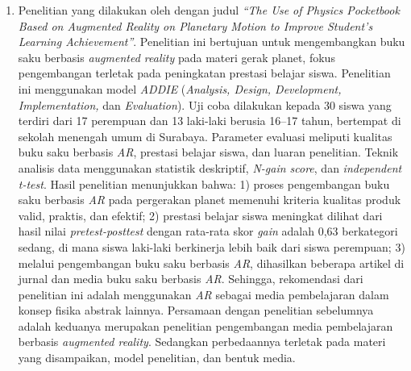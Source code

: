 \documentclass[12pt]{article}
\begin{document}
\begin{enumerate}
    \item Penelitian yang dilakukan oleh \citet{suprapto2021} dengan judul \textit{“The Use of Physics Pocketbook Based on Augmented Reality on Planetary Motion to Improve Student’s Learning Achievement”}. Penelitian ini bertujuan untuk mengembangkan buku saku berbasis \textit{augmented reality} pada materi gerak planet, fokus pengembangan terletak pada peningkatan prestasi belajar siswa. Penelitian ini menggunakan model \textit{ADDIE} (\textit{Analysis, Design, Development, Implementation,} dan \textit{Evaluation}). Uji coba dilakukan kepada 30 siswa yang terdiri dari 17 perempuan dan 13 laki-laki berusia 16–17 tahun, bertempat di sekolah menengah umum di Surabaya. Parameter evaluasi meliputi kualitas buku saku berbasis \textit{AR}, prestasi belajar siswa, dan luaran penelitian. Teknik analisis data menggunakan statistik deskriptif, \textit{N-gain score}, dan \textit{independent t-test}. Hasil penelitian menunjukkan bahwa: 1) proses pengembangan buku saku berbasis \textit{AR} pada pergerakan planet memenuhi kriteria kualitas produk valid, praktis, dan efektif; 2) prestasi belajar siswa meningkat dilihat dari hasil nilai \textit{pretest-posttest} dengan rata-rata skor \textit{gain} adalah 0{,}63 berkategori sedang, di mana siswa laki-laki berkinerja lebih baik dari siswa perempuan; 3) melalui pengembangan buku saku berbasis \textit{AR}, dihasilkan beberapa artikel di jurnal dan media buku saku berbasis \textit{AR}. Sehingga, rekomendasi dari penelitian ini adalah menggunakan \textit{AR} sebagai media pembelajaran dalam konsep fisika abstrak lainnya. Persamaan dengan penelitian sebelumnya adalah keduanya merupakan penelitian pengembangan media pembelajaran berbasis \textit{augmented reality}. Sedangkan perbedaannya terletak pada materi yang disampaikan, model penelitian, dan bentuk media.

\end{enumerate}
\end{document}
